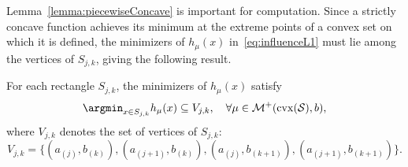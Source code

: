 \documentclass[stsy,sglanonrev]{informs4}
\begin{document}
Lemma~\ref{lemma:piecewiseConcave} is important for computation. Since a strictly concave function achieves its minimum at the extreme points of a convex set on which it is defined, the minimizers of \( h_{\mu}(x) \) in~\eqref{eq:influenceL1} must lie among the vertices of \( S_{j,k} \), giving the following result. 
\begin{lemma}\label{thm:vertex_min}
    For each rectangle \( S_{j,k} \), the minimizers of \( h_{\mu}(x) \) satisfy
    \begin{equation}\label{eq:optInfluence}
        \argmin_{x \in S_{j,k}} h_{\mu}(x) \subseteq V_{j,k}, \quad \forall \mu\in\mathcal{M}^+(\mathrm{cvx}(\mathcal{S}), b),
    \end{equation}
    where \( V_{j,k} \) denotes the set of vertices of \( S_{j,k} \):
    \[
    V_{j,k} = \{(a_{(j)}, b_{(k)}), (a_{(j+1)}, b_{(k)}), (a_{(j)}, b_{(k+1)}), (a_{(j+1)}, b_{(k+1)})\}.
    \]
\end{lemma}
\end{document}
